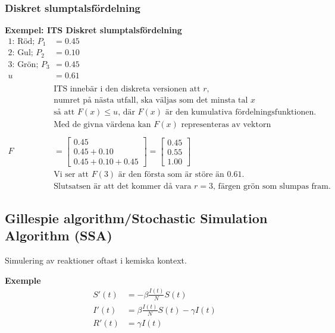 \subsubsection{Diskret slumptalsfördelning}

\textbf{Exempel: ITS Diskret slumptalsfördelning}
\begin{align*}
  \text{1: Röd; } P_1 &= 0.45 \\
  \text{2: Gul; } P_2 &= 0.10 \\
  \text{3: Grön; } P_3 &= 0.45 \\
  u&=0.61 \\
  \\
  &\text{ITS innebär i den diskreta versionen att $r$,} \\
  &\text{numret på nästa utfall, ska väljas som det minsta tal $x$} \\
  &\text{så att } F(x)\leq u \text{, där $F(x)$ är den kumulativa fördelningsfunktionen.} \\
  &\text{Med de givna värdena kan $F(x)$ representeras av vektorn} \\
  \\
  F &= 
  \begin{bmatrix}
    0.45 \\
    0.45 + 0.10 \\
    0.45 + 0.10 + 0.45 
  \end{bmatrix} =
  \begin{bmatrix}
    0.45 \\
    0.55 \\
    1.00 
  \end{bmatrix} \\
  &\text{Vi ser att $F(3)$ är den första som är störe än $0.61$.} \\
  &\text{Slutsatsen är att det kommer då vara $r=3$, färgen grön som slumpas fram.}
\end{align*}


\newpage

\subsection{Gillespie algorithm/Stochastic Simulation Algorithm (SSA)}
Simulering av reaktioner oftast i kemiska kontext.

\textbf{Exemple}
\begin{align*}
    S'(t) &= -\beta\frac{I(t)}{N}S(t) \\
    I'(t) &= \beta\frac{I(t)}{N}S(t) -\gamma I(t) \\
    R'(t) &= \gamma I(t) \\
\end{align*}


